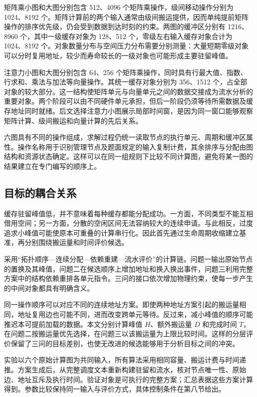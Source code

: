 矩阵乘小图和大图分别包含 512、4096 个矩阵乘操作，级间移动操作分别为 1024、8192 个。矩阵计算前的两个输入通常由级间搬运提供，因而单纯提前矩阵操作的排序优先级，仍会受到数据到达时刻的约束。两图的缓冲区分别有 1216、8960 个，其中一级缓存对象为 128、512 个，零级左右输入缓存对象合计为 1024、8192 个。对象数量分布与空间压力分布需要分别测量：大量短期零级对象可以分时复用地址，较少而寿命较长的一级对象也可能形成主要驻留峰值。

注意力小图和大图分别包含 64、256 个矩阵乘操作，同时具有行最大值、指数、行求和、乘法与加法等向量操作。其统一缓存对象分别为 356、1512 个，占全部对象的较大部分。这一结构使矩阵单元与向量单元之间的数据交接成为流水分析的重要对象。两个阶段可以由不同硬件单元承担，但后一阶段仍须等待所需数据及缓存地址同时就绪。后文选择注意力小图展示局部时间窗，是因为同一窗口能够观察矩阵计算、级间搬运和向量计算的先后关系。

六图具有不同的操作组成，求解过程仍统一读取节点的执行单元、周期和缓冲区属性。操作名称用于识别管理节点及题面规定的输入复制计费，其余排序与分配由图结构和资源状态确定。这样可以在同一组规则下比较不同计算图，避免将某一图的结果建立在专门编写的顺序上。

\subsection{目标的耦合关系}
缓存驻留峰值低，并不意味着每种缓存都能分配成功。一方面，不同类型不能互相借用空间；另一方面，分散的空闲区间无法容纳较大的连续申请。与此相反，过度追求小峰值可能使原本可重叠的计算串行化。因此首先通过生命周期收缩建立基准，再分别围绕搬运量和时间评价候选。

采用“拓扑顺序—连续分配—依赖重建—流水评价”的计算链。问题一输出原始节点的置换及其峰值，问题二在候选顺序上增加地址和换入换出事件，问题三利用完整方案中的结构依赖重排各单元指令。三问的接口依次增加物理约束，使每一步产生的中间对象都具有明确含义。

同一操作顺序可以对应不同的连续地址方案。即使两种地址方案引起的搬运量相同，地址复用边也可能不同，进而改变跨单元等待。反过来，减小峰值的顺序可能推迟本可提前加载的数据。本文分别计算峰值 $H$、额外搬运量 $D$ 和完成时间 $T$，在问题二按搬运量优先选择，在问题三以该搬运量为上限比较时间。这样的分层评价保留了三问的目标差别，也使无改进的候选能够用于分析目标之间的冲突。

实验以六个原始计算图为共同输入，所有算法采用相同容量、搬运计费与时间递推。方案生成后，从完整调度文本重新构建驻留和流水，核对节点唯一性、原始边、地址互斥及执行时间。验证对象是可执行的完整方案；汇总表据这些方案计算得到。参数比较保持同一输入与评价方式，具体控制条件在第八节给出。
